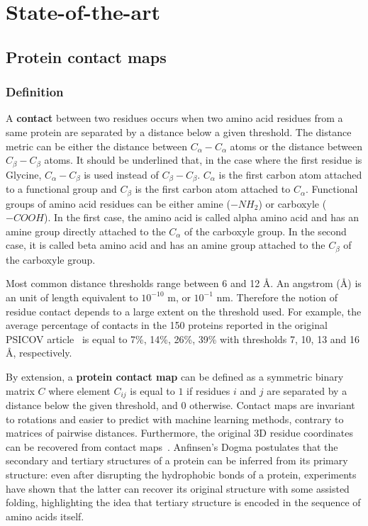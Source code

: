 \chapter{State-of-the-art}

\section{Protein contact maps}

    \subsection{Definition}

        A \textbf{contact} between two residues occurs when two amino acid residues from a same protein are separated by a distance below a given threshold.
        The distance metric can be either the distance between $C_{\alpha}-C_{\alpha}$ atoms or the distance between $C_{\beta}-C_{\beta}$ atoms.
        It should be underlined that, in the case where the first residue is Glycine, $C_{\alpha}-C_{\beta}$ is used instead of $C_{\beta}-C_{\beta}$.
        $C_{\alpha}$ is the first carbon atom attached to a functional group and $C_{\beta}$ is the first carbon atom attached to $C_{\alpha}$.
        Functional groups of amino acid residues can be either
        amine ($-NH_2$) or carboxyle ($-COOH$). In the first case, the amino acid is called alpha amino acid and has an amine group
        directly attached to the $C_{\alpha}$ of the carboxyle group. In the second case, it is called beta amino acid and has an amine group attached to 
        the $C_{\beta}$ of the carboxyle group.

        Most common distance thresholds range between 6 and 12 \AA{}. An angstrom (\AA{}) is an unit of length equivalent to $10^{-10}$ m, or $10^{-1}$ nm.
        Therefore the notion of residue contact depends to a large extent on the threshold used.
        For example, the average percentage of contacts in the 150 proteins reported in the original PSICOV article~\cite{doi:10.1093/bioinformatics/btr638}
        is equal to 7\%, 14\%, 26\%, 39\% with thresholds 7, 10, 13 and 16 \AA{}, respectively.

        By extension, a \textbf{protein contact map} can be defined as a symmetric binary matrix $C$ where element $C_{ij}$ is equal to $1$ if residues $i$ and $j$
        are separated by a distance below the given threshold, and $0$ otherwise. Contact maps are invariant to rotations and easier to predict
        with machine learning methods, contrary to matrices of pairwise distances. Furthermore, the original 3D residue coordinates can be recovered from
        contact maps~\cite{10.1007/978-3-540-72031-7_53}. Anfinsen's Dogma postulates that the secondary and tertiary structures 
        of a protein can be inferred from its primary structure: even after disrupting the hydrophobic bonds of a protein, experiments have shown
        that the latter can recover its original structure with some assisted folding,
        highlighting the idea that tertiary structure is encoded in the sequence of amino acids itself.


